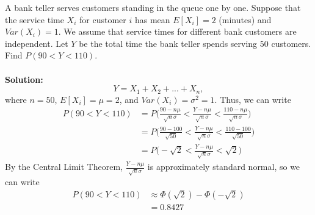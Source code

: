 \documentclass{book}
\begin{document}
    A bank teller serves customers standing in the queue one by one. Suppose that the service time $X_i$ for customer $i$ has mean $E[X_i]=2$ (minutes) and $Var(X_i)=1$. We assume that service times for different bank customers are independent. Let $Y$ be the total time the bank teller spends serving $50$ customers. Find $P(90<Y<110)$.\\\\
    \textbf{Solution:}\\
    \begin{equation*}
        Y = X_1 + X_2 + ... + X_n,
    \end{equation*}
    where $n=50$, $E[X_i]=\mu=2$, and $Var(X_i)=\sigma^2=1$. Thus, we can write
    \begin{align*}
        P(90<Y<110) &= P\Bigg(\frac{90-n\mu}{\sqrt{n}\sigma} < \frac{Y-n\mu}{\sqrt{n}\sigma} < \frac{110-n\mu}{\sqrt{n}\sigma}\Bigg)\\
        &= P\Bigg(\frac{90-100}{\sqrt{50}} < \frac{Y-n\mu}{\sqrt{n}\sigma} < \frac{110-100}{\sqrt{50}}\Bigg)\\
        &= P\Bigg(-\sqrt{2} < \frac{Y-n\mu}{\sqrt{n}\sigma} < \sqrt{2}\Bigg)
    \end{align*}
    By the Central Limit Theorem, $\frac{Y-n\mu}{\sqrt{n}\sigma}$ is approximately standard normal, so we can write
    \begin{align*}
        P(90<Y<110) &\approx \Phi(\sqrt{2}) - \Phi(-\sqrt{2})\\
        &= 0.8427
    \end{align*}
\end{document}
